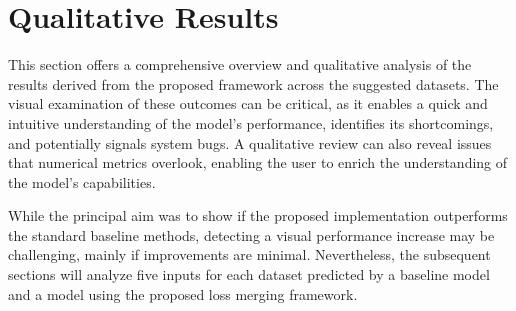 \section{Qualitative Results}
\label{sec:qualitative_results}
This section offers a comprehensive overview and qualitative analysis of the results derived from the proposed framework across the suggested datasets. The visual examination of these outcomes can be critical, as it enables a quick and intuitive understanding of the model's performance, identifies its shortcomings, and potentially signals system bugs. A qualitative review can also reveal issues that numerical metrics overlook, enabling the user to enrich the understanding of the model's capabilities.

While the principal aim was to show if the proposed implementation outperforms the standard baseline methods, detecting a visual performance increase may be challenging, mainly if improvements are minimal. Nevertheless, the subsequent sections will analyze five inputs for each dataset predicted by a baseline model and a model using the proposed loss merging framework.
